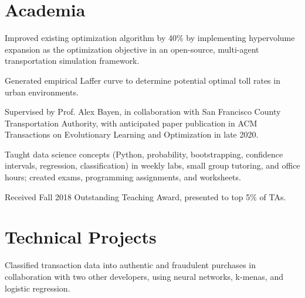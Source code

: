 \documentclass[]{single_column_resume}
\begin{document}

\section{Academia}

\noindent{}
\hfill {}
\begin{tightemize}
    \item Improved existing optimization algorithm by 40\% by implementing hypervolume expansion as the optimization objective in an open-source, multi-agent transportation simulation framework.
    \item Generated empirical Laffer curve to determine potential optimal toll rates in urban environments.
    \item Supervised by Prof. Alex Bayen, in collaboration with San Francisco County Transportation Authority, with anticipated paper publication in ACM Transactions on Evolutionary Learning and Optimization in late 2020.
\end{tightemize}
\sectionsep

\noindent{}
\hfill {}
\begin{tightemize}
    \item Taught data science concepts (Python, probability, bootstrapping, confidence intervals, regression, classification) in weekly labs, small group tutoring, and office hours; created exams, programming assignments, and worksheets.
    \item Received Fall 2018 Outstanding Teaching Award, presented to top 5\% of TAs.
\end{tightemize}
\sectionsep



\section{Technical Projects}
\hfill {}
\begin{tightemize}
   \item Classified transaction data into authentic and fraudulent purchases in collaboration with two other developers, using neural networks, k-menas, and logistic regression.
\end{tightemize}
\sectionsep
\end{document}
